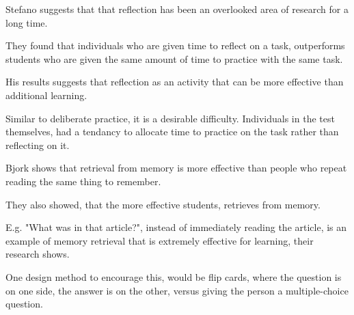   Stefano \cite{stefano} suggests that that reflection has been an overlooked area of research for a long time.

  They found that individuals who are given time to reflect on a task, outperforms students who are given the same amount of time to practice with the same task.

  His results suggests that reflection as an activity that can be more effective than additional learning.

  Similar to deliberate practice, it is a desirable difficulty. Individuals in the test themselves, had a tendancy to allocate time to practice on the task rather than reflecting on it.


  Bjork \cite{bjork} shows that retrieval from memory is more effective than people who repeat reading the same thing to remember.

  They also showed, that the more effective students, retrieves from memory.

  E.g. "What was in that article?", instead of immediately reading the article, is an example of memory retrieval that is extremely effective for learning, their research shows.

  One design method to encourage this, would be flip cards, where the question is on one side, the answer is on the other, versus giving the person a multiple-choice question.



%
